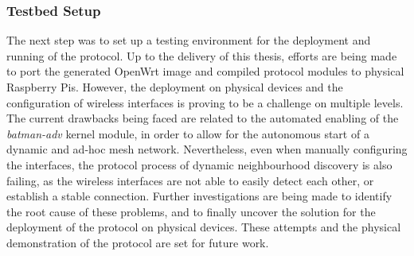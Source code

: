 \subsubsection{Testbed Setup} \label{sec:infrastructure:testbed}


The next step was to set up a testing environment for the deployment and running of the \pol{} protocol. Up to the delivery of this thesis, efforts are being made to port the generated OpenWrt image and compiled protocol modules to physical Raspberry Pis. However, the deployment on physical devices and the configuration of wireless interfaces is proving to be a challenge on multiple levels. The current drawbacks being faced are related to the automated enabling of the \emph{batman-adv} kernel module, in order to allow for the autonomous start of a dynamic and ad-hoc mesh network. Nevertheless, even when manually configuring the interfaces, the protocol process of dynamic neighbourhood discovery is also failing, as the wireless interfaces are not able to easily detect each other, or establish a stable connection. Further investigations are being made to identify the root cause of these problems, and to finally uncover the solution for the deployment of the protocol on physical devices. These attempts and the physical demonstration of the \pol{} protocol are set for future work.

